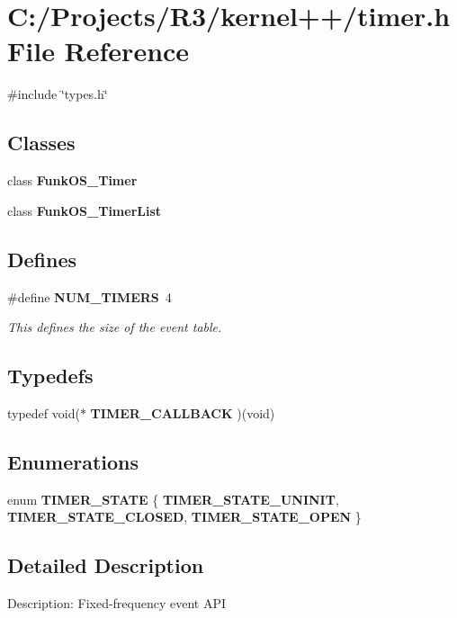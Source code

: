 \section{C:/Projects/R3/kernel++/timer.h File Reference}
\label{timer_8h}
{\ttfamily \#include \char`\"{}types.h\char`\"{}}\par
\subsection*{Classes}
\begin{DoxyCompactItemize}
\item 
class {\bf FunkOS\_\-Timer}
\item 
class {\bf FunkOS\_\-TimerList}
\end{DoxyCompactItemize}
\subsection*{Defines}
\begin{DoxyCompactItemize}
\item 
\#define {\bf NUM\_\-TIMERS}~4
\begin{DoxyCompactList}\small\item\em This defines the size of the event table. \item\end{DoxyCompactList}\end{DoxyCompactItemize}
\subsection*{Typedefs}
\begin{DoxyCompactItemize}
\item 
typedef void($\ast$ {\bf TIMER\_\-CALLBACK} )(void)
\end{DoxyCompactItemize}
\subsection*{Enumerations}
\begin{DoxyCompactItemize}
\item 
enum {\bf TIMER\_\-STATE} \{ {\bf TIMER\_\-STATE\_\-UNINIT}, 
{\bf TIMER\_\-STATE\_\-CLOSED}, 
{\bf TIMER\_\-STATE\_\-OPEN}
 \}
\end{DoxyCompactItemize}


\subsection{Detailed Description}
Description: Fixed-\/frequency event API 

